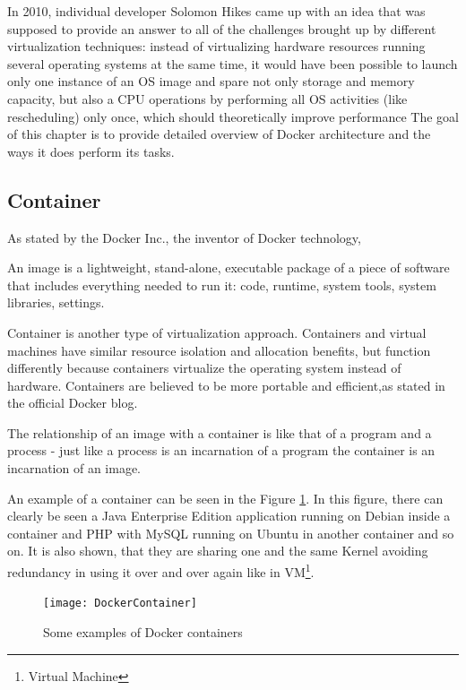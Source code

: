 In 2010, individual developer Solomon Hikes came up with an idea that was
supposed to provide an answer to all of the challenges brought up by different
virtualization techniques: instead of virtualizing hardware resources running
several operating systems at the same time, it would have been possible
to launch only one instance of an OS image and spare not only storage and memory capacity,
but also a CPU operations by performing all
OS activities (like rescheduling) only once, which should theoretically
improve performance
The goal of this chapter is to provide detailed overview of Docker architecture
and the ways it does perform its tasks.

\subsection{Container}

As stated by the Docker Inc., the inventor of Docker technology,

\begin{definition}
An image is a lightweight, stand-alone,
executable package of a piece of software that includes everything
needed to run it: code, runtime,
system tools, system libraries, settings\cite{DockerDefinition}.
\end{definition}

Container is another type of virtualization approach.
Containers and virtual machines have
similar resource isolation and allocation benefits,
but function differently because containers
virtualize the operating system instead of hardware.
Containers are believed to be more portable and
efficient,as stated in
the official Docker blog\cite{DockerEfficiency}.

The relationship of an image with
a container is like that of a program and a process -
just like a process is an incarnation of a program
the container is an incarnation of an image.

An example of a container can be
seen in the Figure \ref{fig:DockerContainerPic}.
In this figure, there can clearly be seen a Java Enterprise Edition application
running on Debian inside a container and PHP with MySQL running
on Ubuntu in another container and so on.
It is also shown, that they are sharing
one and the same Kernel avoiding redundancy in using it
over and over again like in VM\footnote{Virtual Machine}.

\begin{figure}
\texttt{[image: DockerContainer]}
\caption{Some examples of Docker containers}
\cite{DockerContainerPic}
\label{fig:DockerContainerPic}
\end{figure}

